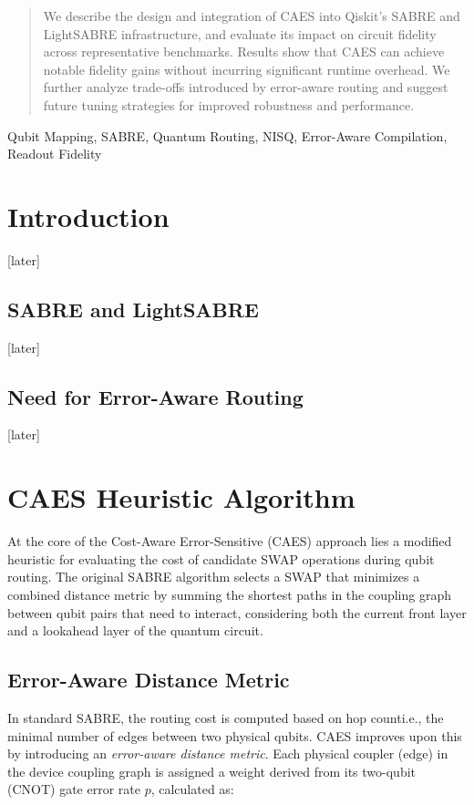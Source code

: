 \documentclass[conference]{IEEEtran}
\begin{document}
\begin{abstract}
We describe the design and integration of CAES into Qiskit’s SABRE and LightSABRE infrastructure, and evaluate its impact on circuit fidelity across representative benchmarks. Results show that CAES can achieve notable fidelity gains without incurring significant runtime overhead. We further analyze trade-offs introduced by error-aware routing and suggest future tuning strategies for improved robustness and performance.
\end{abstract}

\begin{IEEEkeywords}
Qubit Mapping, SABRE, Quantum Routing, NISQ, Error-Aware Compilation, Readout Fidelity
\end{IEEEkeywords}


\section{Introduction}
[later]
\subsection{SABRE and LightSABRE}
[later]
\subsection{Need for Error-Aware Routing}
[later]
\section{CAES Heuristic Algorithm}

At the core of the Cost-Aware Error-Sensitive (CAES) approach lies a modified heuristic for evaluating the cost of candidate SWAP operations during qubit routing. The original SABRE algorithm selects a SWAP that minimizes a combined distance metric by summing the shortest paths in the coupling graph between qubit pairs that need to interact, considering both the current front layer and a lookahead layer of the quantum circuit.

\subsection{Error-Aware Distance Metric}

In standard SABRE, the routing cost is computed based on hop count\textemdash i.e., the minimal number of edges between two physical qubits. CAES improves upon this by introducing an \textit{error-aware distance metric}. Each physical coupler (edge) in the device coupling graph is assigned a weight derived from its two-qubit (CNOT) gate error rate $p$, calculated as:
\end{document}
